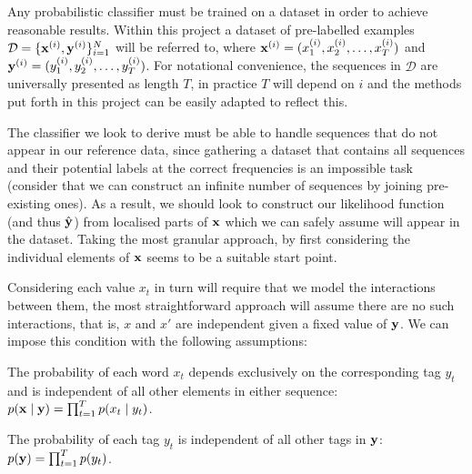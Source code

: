 \documentclass[../main.tex]{subfiles}
\begin{document}
Any probabilistic classifier must be trained on a dataset in order to achieve reasonable results.
Within this project a dataset of pre-labelled examples $\mathcal{D} = \{\mathbf{x}^{(i)},\mathbf{y}^{(i)}\}_{i=1}^N$ will be referred to, where $\mathbf{x}^{(i)}=(x^{(i)}_1,x^{(i)}_2,\ldots,x^{(i)}_T)$ and $\mathbf{y}^{(i)}=(y^{(i)}_1,y^{(i)}_2,\ldots,y^{(i)}_T)$. For notational convenience, the sequences in $\mathcal{D}$ are universally presented as length $T$, in practice $T$ will depend on $i$ and the methods put forth in this project can be easily adapted to reflect this.

The classifier we look to derive must be able to handle sequences that do not appear in our reference data, since gathering a dataset that contains all sequences and their potential labels at the correct frequencies is an impossible task (consider that we can construct an infinite number of sequences by joining pre-existing ones).
As a result, we should look to construct our likelihood function (and thus $\hat{\mathbf{y}}$) from localised parts of $\mathbf{x}$ which we can safely assume will appear in the dataset.
Taking the most granular approach, by first considering the individual elements of $\mathbf{x}$ seems to be a suitable start point.

Considering each value $x_t$ in turn will require that we model the interactions between them, the most straightforward approach will assume there are no such interactions, that is, $x$ and $x'$ are independent given a fixed value of $\mathbf{y}$. We can impose this condition with the following assumptions:
\begin{assumption} \label{ass:ind-obs}
The probability of each word $x_t$ depends exclusively on the corresponding tag $y_t$ and is independent of all other elements in either sequence: $p(\mathbf{x} \mid \mathbf{y}) = \prod_{t=1}^T p(x_t \mid y_t)$.
\end{assumption}
\begin{assumption} \label{ass:ind-tags}
The probability of each tag $y_t$ is independent of all other tags in $\mathbf{y}$: $p(\mathbf{y}) = \prod_{t=1}^T p(y_t)$.
\end{assumption}
\end{document}
